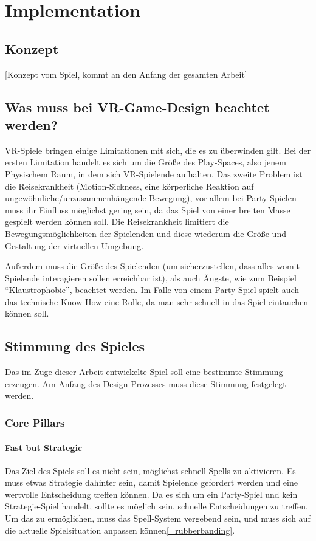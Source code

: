 \chapter{Implementation}

\section{Konzept}

[Konzept vom Spiel, kommt an den Anfang der gesamten Arbeit]

\section{Was muss bei VR-Game-Design beachtet werden?}

VR-Spiele bringen einige Limitationen mit sich, die es zu überwinden gilt. Bei der ersten Limitation handelt es sich um die Größe des Play-Spaces, also jenem Physischem Raum, in dem sich VR-Spielende aufhalten. Das zweite Problem ist die Reisekrankheit (Motion-Sickness, eine körperliche Reaktion auf ungewöhnliche/unzusammenhängende Bewegung\cite[S. 533]{_art_of_gamedesign}), vor allem bei Party-Spielen muss ihr Einfluss möglichst gering sein, da das Spiel von einer breiten Masse gespielt werden können soll. Die Reisekrankheit limitiert die Bewegungsmöglichkeiten der Spielenden und diese wiederum die Größe und Gestaltung der virtuellen Umgebung.

Außerdem muss die Größe des Spielenden (um sicherzustellen, dass alles womit Spielende interagieren sollen erreichbar ist), als auch Ängste, wie zum Beispiel "`Klaustrophobie"', beachtet werden. Im Falle von einem Party Spiel spielt auch das technische Know-How eine Rolle, da man sehr schnell in das Spiel eintauchen können soll.

\section{Stimmung des Spieles}
Das im Zuge dieser Arbeit entwickelte Spiel soll eine bestimmte Stimmung erzeugen. Am Anfang des Design-Prozesses muss diese Stimmung festgelegt werden.

\subsection{Core Pillars}

\subsubsection{Fast but Strategic}
Das Ziel des Spiels soll es nicht sein, möglichst schnell Spells zu aktivieren. Es muss etwas Strategie dahinter sein, damit Spielende gefordert werden und eine wertvolle Entscheidung treffen können. Da es sich um ein Party-Spiel und kein Strategie-Spiel handelt, sollte es möglich sein, schnelle Entscheidungen zu treffen. Um das zu ermöglichen, muss das Spell-System vergebend sein, und muss sich auf die aktuelle Spielsituation anpassen können\ref{_rubberbanding}. 

